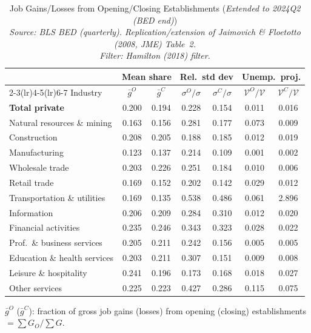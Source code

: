 \begin{table}[htbp]
\centering
\small
\caption{Job Gains/Losses from Opening/Closing Establishments (\emph{Extended to 2024Q2 (BED end)}) \\
  \emph{Source: BLS BED (quarterly). Replication/extension of Jaimovich \& Floetotto (2008, JME) Table~2.} \\  \emph{Filter: Hamilton (2018) filter.}}
\label{tab:jf_t2_ext_2024_ham}
\begin{tabular}{lcccccc}
\toprule
 & \multicolumn{2}{c}{Mean share} & \multicolumn{2}{c}{Rel.\ std dev} & \multicolumn{2}{c}{Unemp.\ proj.} \\
\cmidrule(lr){2-3}\cmidrule(lr){4-5}\cmidrule(lr){6-7}
Industry & $\bar{g}^O$ & $\bar{g}^C$ & $\sigma^O/\sigma$ & $\sigma^C/\sigma$ & $\mathcal{V}^O/\mathcal{V}$ & $\mathcal{V}^C/\mathcal{V}$ \\
\midrule
\midrule
\textbf{Total private} & 0.200 & 0.194 & 0.228 & 0.154 & 0.011 & 0.016 \\
Natural resources \& mining & 0.163 & 0.156 & 0.281 & 0.177 & 0.073 & 0.009 \\
Construction & 0.208 & 0.205 & 0.188 & 0.185 & 0.012 & 0.019 \\
Manufacturing & 0.123 & 0.137 & 0.214 & 0.109 & 0.001 & 0.002 \\
Wholesale trade & 0.203 & 0.226 & 0.251 & 0.184 & 0.010 & 0.006 \\
Retail trade & 0.169 & 0.152 & 0.202 & 0.142 & 0.029 & 0.012 \\
Transportation \& utilities & 0.169 & 0.135 & 0.538 & 0.486 & 0.061 & 2.896 \\
Information & 0.206 & 0.209 & 0.284 & 0.310 & 0.012 & 0.020 \\
Financial activities & 0.235 & 0.246 & 0.343 & 0.323 & 0.028 & 0.022 \\
Prof.~\& business services & 0.205 & 0.211 & 0.242 & 0.156 & 0.005 & 0.005 \\
Education \& health services & 0.203 & 0.211 & 0.307 & 0.151 & 0.009 & 0.008 \\
Leisure \& hospitality & 0.241 & 0.196 & 0.173 & 0.168 & 0.018 & 0.027 \\
Other services & 0.225 & 0.223 & 0.427 & 0.286 & 0.115 & 0.075 \\
\bottomrule
\end{tabular}
\begin{tablenotes}[flushleft]\footnotesize
\item $\bar{g}^O$ ($\bar{g}^C$): fraction of gross job gains (losses) from opening (closing) establishments $= \sum G_O / \sum G$.

\end{tablenotes}
\end{table}
